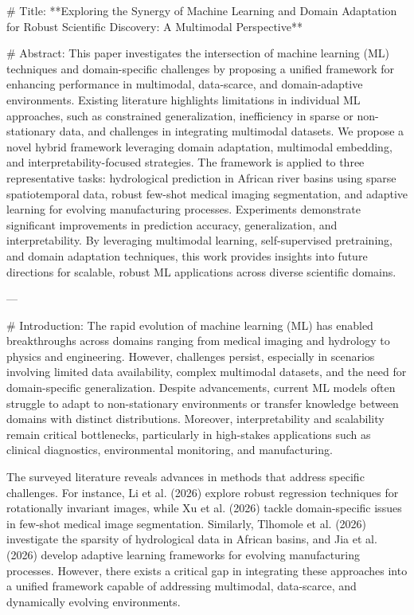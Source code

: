 # Title:
**Exploring the Synergy of Machine Learning and Domain Adaptation for Robust Scientific Discovery: A Multimodal Perspective**

# Abstract:
This paper investigates the intersection of machine learning (ML) techniques and domain-specific challenges by proposing a unified framework for enhancing performance in multimodal, data-scarce, and domain-adaptive environments. Existing literature highlights limitations in individual ML approaches, such as constrained generalization, inefficiency in sparse or non-stationary data, and challenges in integrating multimodal datasets. We propose a novel hybrid framework leveraging domain adaptation, multimodal embedding, and interpretability-focused strategies. The framework is applied to three representative tasks: hydrological prediction in African river basins using sparse spatiotemporal data, robust few-shot medical imaging segmentation, and adaptive learning for evolving manufacturing processes. Experiments demonstrate significant improvements in prediction accuracy, generalization, and interpretability. By leveraging multimodal learning, self-supervised pretraining, and domain adaptation techniques, this work provides insights into future directions for scalable, robust ML applications across diverse scientific domains.

---

# Introduction:
The rapid evolution of machine learning (ML) has enabled breakthroughs across domains ranging from medical imaging and hydrology to physics and engineering. However, challenges persist, especially in scenarios involving limited data availability, complex multimodal datasets, and the need for domain-specific generalization. Despite advancements, current ML models often struggle to adapt to non-stationary environments or transfer knowledge between domains with distinct distributions. Moreover, interpretability and scalability remain critical bottlenecks, particularly in high-stakes applications such as clinical diagnostics, environmental monitoring, and manufacturing.

The surveyed literature reveals advances in methods that address specific challenges. For instance, Li et al. (2026) explore robust regression techniques for rotationally invariant images, while Xu et al. (2026) tackle domain-specific issues in few-shot medical image segmentation. Similarly, Tlhomole et al. (2026) investigate the sparsity of hydrological data in African basins, and Jia et al. (2026) develop adaptive learning frameworks for evolving manufacturing processes. However, there exists a critical gap in integrating these approaches into a unified framework capable of addressing multimodal, data-scarce, and dynamically evolving environments.

